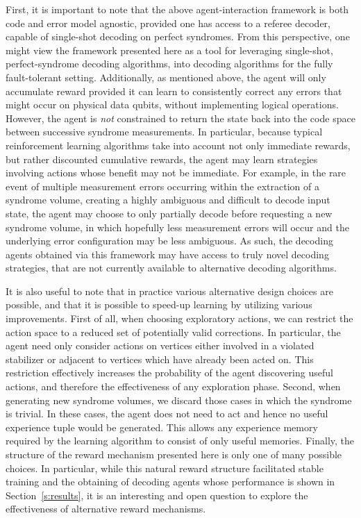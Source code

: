 \documentclass[twocolumn,preprintnumbers,amsmath,amssymb,notitlepage,nofootinbib,longbibliography,superscriptaddress,aps,pra,10pt]{revtex4-1}
\begin{document}
	First, it is important to note that the above agent-interaction framework is both code and error model agnostic, provided one has access to a referee decoder, capable of single-shot decoding on perfect syndromes.
	From this perspective, one might view the framework presented here as a tool for leveraging single-shot, perfect-syndrome decoding algorithms, into decoding algorithms for the fully fault-tolerant setting.
	Additionally, as mentioned above, the agent will only accumulate reward provided it can learn to consistently correct any errors that might occur on physical data qubits, without implementing logical operations.
	However, the agent is \textit{not} constrained to return the state back into the code space between successive syndrome measurements.
	In particular, because typical reinforcement learning algorithms take into account not only immediate rewards, but rather discounted cumulative rewards, the agent may learn strategies involving actions whose benefit may not be immediate.
	For example, in the rare event of multiple measurement errors occurring within the extraction of a syndrome volume, creating a highly ambiguous and difficult to decode input state, the agent may choose to only partially decode before requesting a new syndrome volume, in which hopefully less measurement errors will occur and the underlying error configuration may be less ambiguous.
	As such, the decoding agents obtained via this framework may have access to truly novel decoding strategies, that are not currently available to alternative decoding algorithms.

	It is also useful to note that in practice various alternative design choices are possible, and that it is possible to speed-up learning by utilizing various improvements.
	First of all, when choosing exploratory actions, we can restrict the action space to a reduced set of potentially valid corrections.
	In particular, the agent need only consider actions on vertices either involved in a violated stabilizer or adjacent to vertices which have already been acted on.
	This restriction effectively increases the probability of the agent discovering useful actions, and therefore the effectiveness of any exploration phase.
	Second, when generating new syndrome volumes, we discard those cases in which the syndrome is trivial.
	In these cases, the agent does not need to act and hence no useful experience tuple would be generated.
	This allows any experience memory required by the learning algorithm to consist of only useful memories.
	Finally, the structure of the reward mechanism presented here is only one of many possible choices.
	In particular, while this natural reward structure facilitated stable training and the obtaining of decoding agents whose performance is shown in Section~\ref{s:results}, it is an interesting and open question to explore the effectiveness of alternative reward mechanisms.
\end{document}
